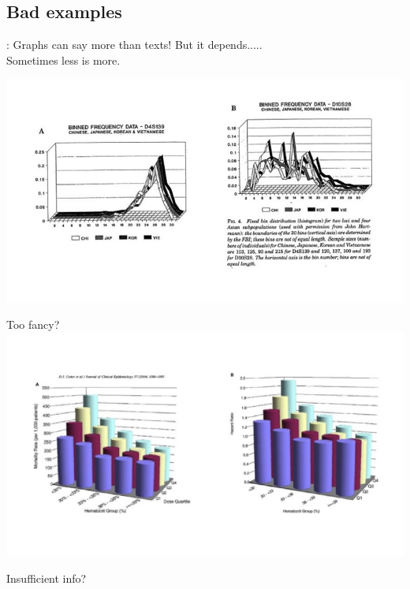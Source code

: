 \subsection{Bad examples}
\begin{frame}[allowframebreaks]{\secname: \subsecname}
	Graphs can say more than texts! But it depends..... \\
	Sometimes less is more. \\
	\begin{center}
			\includegraphics[scale=0.3]{images/Example2}

	\end{center}

	
	\framebreak
	
	Too fancy? \\
	\includegraphics[scale=0.3]{images/Example1}
	
	\framebreak
	
		Insufficient info?


\end{frame}
